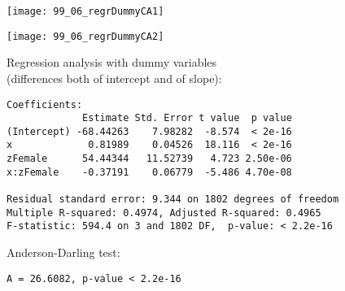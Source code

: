 \begin{frame}
  \vspace{-0.3cm}
  \begin{center}
    \texttt{[image: 99\_06\_regrDummyCA1]}
  \end{center}
\end{frame}

\begin{frame}
  \vspace{-0.3cm}
  \begin{center}
    \texttt{[image: 99\_06\_regrDummyCA2]}
  \end{center}
\end{frame}

\begin{frame}[fragile]
  Regression analysis with dummy variables\\ (differences both of intercept and of slope):\\
  \begin{small}
    \begin{verbatim}
Coefficients:
             Estimate Std. Error t value  p value    
(Intercept) -68.44263    7.98282  -8.574  < 2e-16
x             0.81989    0.04526  18.116  < 2e-16
zFemale      54.44344   11.52739   4.723 2.50e-06
x:zFemale    -0.37191    0.06779  -5.486 4.70e-08

Residual standard error: 9.344 on 1802 degrees of freedom
Multiple R-squared: 0.4974,	Adjusted R-squared: 0.4965 
F-statistic: 594.4 on 3 and 1802 DF,  p-value: < 2.2e-16 
    \end{verbatim}
  \end{small}  
  Anderson-Darling test:\\
  \begin{small}
    \begin{verbatim}
A = 26.6082, p-value < 2.2e-16
    \end{verbatim}
  \end{small}
\end{frame}

